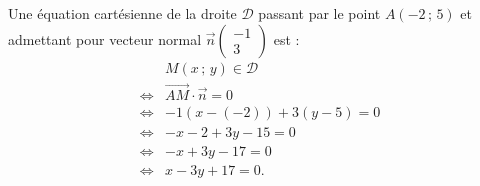 Une équation cartésienne de la droite \(\mathcal{D}\) passant par le point \(A(-2\,;\,5)\) et admettant pour vecteur normal \(\vec{n} \begin{pmatrix} -1 \\ 3 \end{pmatrix}\) est :
\begin{align*}
&M(x\,;\,y) \in \mathcal{D} \\
\iff &\overrightarrow{AM} \cdot \vec{n} = 0 \\
\iff &-1(x - (-2)) + 3(y - 5) = 0 \\
\iff &-x - 2 + 3y - 15 = 0 \\
\iff &-x + 3y - 17 = 0 \\
\iff &x - 3y + 17 = 0.
\end{align*}
